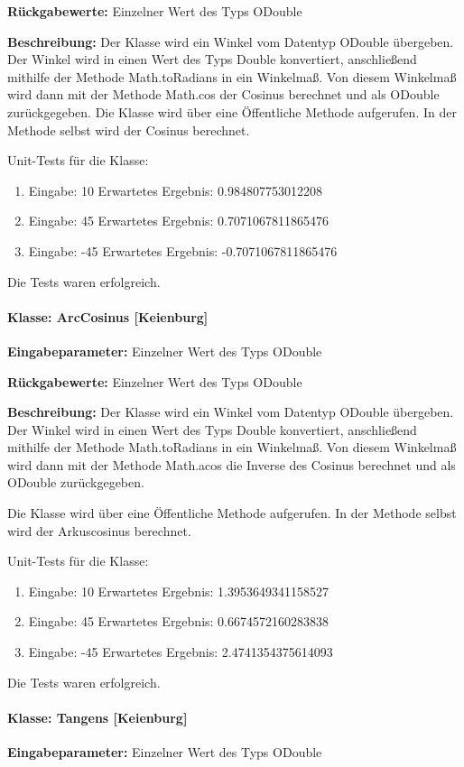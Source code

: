 \textbf{Rückgabewerte: } Einzelner Wert des Typs ODouble
	
\textbf{Beschreibung: } Der Klasse wird ein Winkel vom Datentyp ODouble übergeben. Der Winkel wird in einen Wert des Typs Double konvertiert, anschließend mithilfe der Methode Math.toRadians in ein Winkelmaß. Von diesem Winkelmaß wird dann mit der Methode Math.cos der Cosinus berechnet und als ODouble zurückgegeben.  Die Klasse wird über eine Öffentliche Methode aufgerufen. In der Methode selbst wird der Cosinus berechnet. 
	
Unit-Tests für die Klasse: 	
\begin{enumerate}
	\item Eingabe:  10 Erwartetes Ergebnis: 0.984807753012208
	\item Eingabe:  45 Erwartetes Ergebnis: 0.7071067811865476
	\item Eingabe: -45 Erwartetes Ergebnis: -0.7071067811865476
\end{enumerate}
Die Tests waren erfolgreich.

\paragraph{Klasse: ArcCosinus [Keienburg]}
\textbf{Eingabeparameter: } Einzelner Wert des Typs ODouble

\textbf{Rückgabewerte: } Einzelner Wert des Typs ODouble

\textbf{Beschreibung: } Der Klasse wird ein Winkel vom Datentyp ODouble übergeben. Der Winkel wird in einen Wert des Typs Double konvertiert, anschließend mithilfe der Methode Math.toRadians in ein Winkelmaß. Von diesem Winkelmaß wird dann mit der Methode Math.acos die Inverse des Cosinus berechnet und als ODouble zurückgegeben.  

Die Klasse wird über eine Öffentliche Methode aufgerufen. In der Methode selbst wird der Arkuscosinus berechnet. 

Unit-Tests für die Klasse: 	
\begin{enumerate}
	\item Eingabe:  10 Erwartetes Ergebnis: 1.3953649341158527
	\item Eingabe:  45 Erwartetes Ergebnis: 0.6674572160283838
	\item Eingabe: -45 Erwartetes Ergebnis: 2.4741354375614093
\end{enumerate}
Die Tests waren erfolgreich.

\paragraph{Klasse: Tangens [Keienburg]}
\textbf{Eingabeparameter: } Einzelner Wert des Typs ODouble


